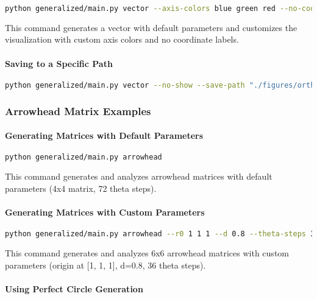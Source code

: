 \begin{lstlisting}[language=bash]
python generalized/main.py vector --axis-colors blue green red --no-coordinate-labels
\end{lstlisting}

This command generates a vector with default parameters and customizes the visualization with custom axis colors and no coordinate labels.

\paragraph{Saving to a Specific Path}

\begin{lstlisting}[language=bash]
python generalized/main.py vector --no-show --save-path "./figures/orthogonal_vector.png"
\end{lstlisting}

\subsubsection{Arrowhead Matrix Examples}

\paragraph{Generating Matrices with Default Parameters}

\begin{lstlisting}[language=bash]
python generalized/main.py arrowhead
\end{lstlisting}

This command generates and analyzes arrowhead matrices with default parameters (4x4 matrix, 72 theta steps).

\paragraph{Generating Matrices with Custom Parameters}

\begin{lstlisting}[language=bash]
python generalized/main.py arrowhead --r0 1 1 1 --d 0.8 --theta-steps 36 --size 6
\end{lstlisting}

This command generates and analyzes 6x6 arrowhead matrices with custom parameters (origin at [1, 1, 1], d=0.8, 36 theta steps).

\paragraph{Using Perfect Circle Generation}


